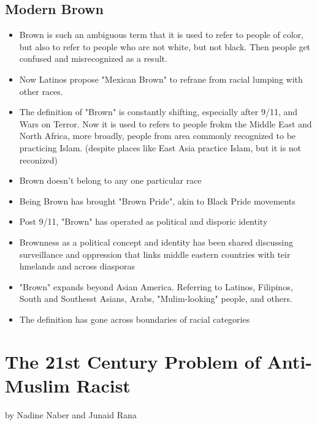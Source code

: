 \documentclass{article}
\begin{document}
  \subsection{Modern Brown}
  \begin{itemize}
    \item Brown is such an ambiguous term that it is used to refer to
      people of color, but also to refer to people who are not
      white, but not black. Then people get confused and misrecognized
      as a result.
    \item Now Latinos propose "Mexican Brown" to refrane from racial
      lumping with other races.
    \item The definition of "Brown" is constantly shifting, especially after
      9/11, and Wars on Terror. Now it is used to refers to people
      frokm the Middle East and North Africa, more broadly, people
      from area commonly recognized to be practicing Islam.
      (despite places like East Asia practice Islam, but it is not reconized)
    \item Brown doesn't belong to any one particular race
    \item Being Brown has brought "Brown Pride", akin to Black Pride movements
    \item Post 9/11, "Brown" has operated as political and disporic identity
    \item Brownness as a political concept and identity has been shared
      discussing surveillance and oppression that links middle eastern countries
      with teir hmelands and across diasporas
    \item "Brown" expands beyond Asian America. Referring to Latinos,
      Filipinos, South and Southesst Asians, Arabs, "Mulim-looking" people,
      and others.
    \item The definition has gone across boundaries of racial categories
  \end{itemize}

  \section{The 21st Century Problem of Anti-Muslim Racist}
  by Nadine Naber and Junaid Rana
\end{document}

